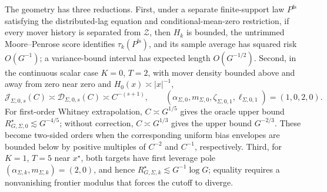 The geometry has three reductions. First, under a separate finite-support law \(P^{\mathrm{fs}}\) satisfying the distributed-lag equation and conditional-mean-zero restriction, if every mover history is separated from \(\mathcal Z\), then \(H_k\) is bounded, the untrimmed Moore--Penrose score identifies \(\tau_k(P^{\mathrm{fs}})\), and its sample average has squared risk \(O(G^{-1})\); a variance-bound interval has expected length \(O(G^{-1/2})\). Second, in the continuous scalar case \(K=0\), \(T=2\), with mover density bounded above and away from zero near zero and \(H_0(x)\asymp|x|^{-1}\), \[\mathcal J_{\Sigma,0,s}(C)\asymp\mathcal D_{\Sigma,0,s}(C)\asymp C^{-(s+1)},\qquad (\alpha_{\Sigma,0},m_{\Sigma,0},\zeta_{\Sigma,0,1},\ell_{\Sigma,0,1})=(1,0,2,0).\] For first-order Whitney extrapolation, \(C\asymp G^{1/5}\) gives the oracle upper bound \(R_{G,\Sigma,0}^{\star}\lesssim G^{-4/5}\); without correction, \(C\asymp G^{1/3}\) gives the upper bound \(G^{-2/3}\). These become two-sided orders when the corresponding uniform bias envelopes are bounded below by positive multiples of \(C^{-2}\) and \(C^{-1}\), respectively. Third, for \(K=1\), \(T=5\) near \(x^\star\), both targets have first leverage pole \((\alpha_{\Sigma,k},m_{\Sigma,k})=(2,0)\), and hence \(R_{G,\Sigma,k}^{\star}\lesssim G^{-1}\log G\); equality requires a nonvanishing frontier modulus that forces the cutoff to diverge.